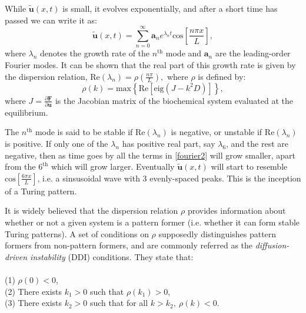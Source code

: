 While $\tilde{\mathbf{u}}(x,t)$ is small, it evolves exponentially, and after a short time has passed we can write it as:
\begin{equation}\label{fourier2}
\tilde{\mathbf{u}}(x,t)=\sum_{n=0}^\infty \mathbf{a}_ne^{\lambda_n t}\text{cos}\left[\frac{n\pi x}{L}\right],
\end{equation}
where $\lambda_n$ denotes the growth rate of the $n^\text{th}$ mode and $\mathbf{a}_n$ are the leading-order Fourier modes. It can be shown that the real part of this growth rate is given by the dispersion relation, $\text{Re}\left(\lambda_n\right)=\rho\left(\frac{n\pi}{L}\right),$ where $\rho$ is defined by:
\begin{equation}\label{disp}
\rho(k)=\text{max}\left\{\text{Re}\left[\text{eig}\left(J-k^2D\right)\right]\right\},
\end{equation}
where $J=\frac{\partial \mathbf{F}}{\partial \mathbf{u}}$ is the Jacobian matrix of the biochemical system evaluated at the equilibrium. 

The $n^\text{th}$ mode is said to be stable if $\text{Re}\left(\lambda_n\right)$ is negative, or unstable if $\text{Re}\left(\lambda_n\right)$ is positive. If only one of the $\lambda_n$ has positive real part, say $\lambda_6$, and the rest are negative, then as time goes by all the terms in \eqref{fourier2} will grow smaller, apart from the $6^\text{th}$ which will grow larger. Eventually $\tilde{\mathbf{u}}(x,t)$ will start to resemble $\text{cos}\left[\frac{6\pi x}{L}\right]$, i.e. a sinsusoidal wave with 3 evenly-spaced peaks. This is the inception of a Turing pattern.

It is widely believed that the dispersion relation $\rho$ provides information about whether or not a given system is a pattern former (i.e. whether it can form stable Turing patterns). A set of conditions on $\rho$ \cite{othmer1969interactions,murray1977lectures} supposedly distinguishes pattern formers from non-pattern formers, and are commonly referred as the \emph{diffusion-driven instability} (DDI) conditions. They state that:~\\~\\
(1) $\rho(0)<0$,~\\
(2) There exists $k_1>0$ such that $\rho(k_1)>0$,~\\
(3) There exists $k_2>0$ such that for all $k>k_2,~ \rho(k)<0$.~\\

